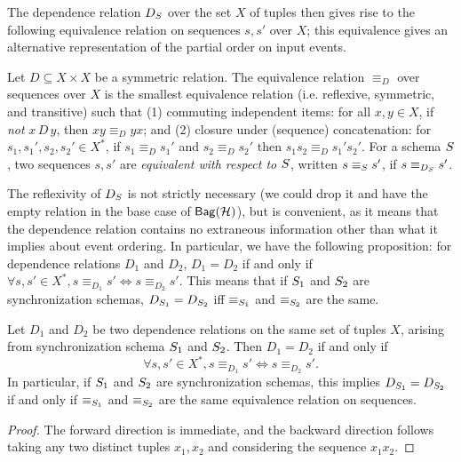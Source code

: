 The dependence relation $D_{\ss}$ over the set $X$ of tuples then gives rise to the following equivalence relation on sequences
$s, s'$ over $X$;
this equivalence gives an alternative representation of the partial order on input events.
\begin{definition}
    Let $D \subseteq X \times X$ be a symmetric relation.
    The equivalence relation $\equiv_D$ over sequences over $X$ is
    the smallest equivalence relation (i.e. reflexive, symmetric, and transitive) such that (1)
    commuting independent items: for all $x, y \in X$, if \emph{not} $x\, D\, y$, then $x y \equiv_D y x$;
    and (2) closure under (sequence) concatenation: for $s_1, s_1', s_2, s_2' \in X^{*}$, if $s_1 \equiv_D s_1'$ and $s_2 \equiv_D s_2'$ then $s_1 s_2 \equiv_D s_1' s_2'$.
    For a schema $\ss$, two sequences $s, s'$ are \emph{equivalent with respect to $\ss$}, written $s \equiv_\ss s'$, if $s \equiv_{D_\ss} s'$.
    \end{definition}

The reflexivity of $D_{\ss}$ is not strictly necessary (we could drop it and have the empty relation in the base case of $\relleaf{\mathcal{H}}$), but is convenient, as it means that the dependence relation contains no extraneous information other than what it implies about event ordering.
In particular,
we have the following proposition:
for dependence relations $D_1$ and $D_2$, $D_1 = D_2$ if and only if
$\forall s, s' \in X^{*}, s \equiv_{D_1} s' \iff s \equiv_{D_2} s'$.
This means that if $\ss_1$ and $\ss_2$ are synchronization schemas,
$D_{\ss_1} = D_{\ss_2}$ iff $\equiv_{\ss_1}$ and $\equiv_{\ss_2}$ are the same.

\begin{proposition}
Let $D_1$ and $D_2$ be two dependence relations on the same set of tuples $X$,
arising from synchronization schema $\ss_1$ and $\ss_2$.
Then $D_1 = D_2$ if and only if
\[
    \forall s, s' \in X^{*}, s \equiv_{D_1} s' \iff s \equiv_{D_2} s'.
\]
In particular, if $\ss_1$ and $\ss_2$ are synchronization schemas, this implies
$D_{\ss_1} = D_{\ss_2}$ if and only if $\equiv_{\ss_1}$ and $\equiv_{\ss_2}$ are the same equivalence relation on sequences.
\end{proposition}
\begin{proof}
The forward direction is immediate, and the backward direction follows
taking any two distinct tuples $x_1, x_2$ and considering the sequence $x_1 x_2$.
\end{proof}

